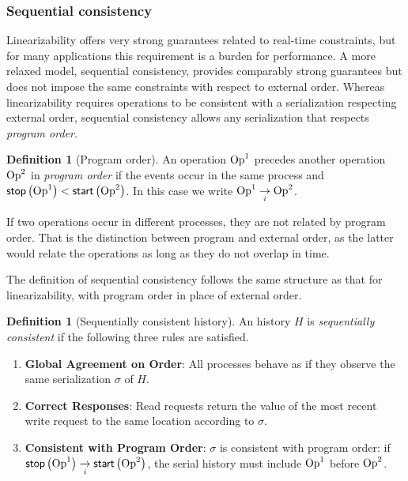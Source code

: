 \documentclass[]             %
{NASA}                       %
\theoremstyle{definition}
\newtheorem{definition}[theorem]{Definition}
\providecommand{\tightlist}{%
  \setlength{\itemsep}{0pt}\setlength{\parskip}{0pt}}
\begin{document}
\subsubsection{Sequential consistency}
\label{sequential-consistency}

Linearizability offers very strong guarantees related to real-time
constraints, but for many applications this requirement is a burden
for performance. A more relaxed model, sequential consistency,
provides comparably strong guarantees but does not impose the same
constraints with respect to external order. Whereas linearizability
requires operations to be consistent with a serialization respecting
external order, sequential consistency allows any serialization that
respects \emph{program order}.

\begin{definition}[Program order]
  An operation $\mathrm{Op}^1$ precedes another operation $\mathrm{Op}^2$ in
  \emph{program order} if the events occur in the same process and
  $\mathsf{stop}\left(\mathrm{Op}^1\right) < \mathsf{start}\left(\mathrm{Op}^2\right)$. In this case we write $\mathrm{Op}^1 \underset{i}{\to} \mathrm{Op}^2$.
\end{definition}
If two operations occur in different processes, they are not related
by program order. That is the distinction between program and external
order, as the latter would relate the operations as long as they do
not overlap in time.

The definition of sequential consistency follows the same structure as
that for linearizability, with program order in place of external
order.

\begin{definition}[Sequentially consistent history]
  \label{def:sequentially-consistent-history}
  An history $H$ is \emph{sequentially consistent} if the following
  three rules are satisfied.
\begin{enumerate}
  \tightlist
\item \textbf{Global Agreement on Order}: All processes behave as if
  they observe the same serialization $\sigma$ of $H$.
\item \textbf{Correct Responses}: Read requests return the value of
  the most recent write request to the same location according to $\sigma$.
\item \textbf{Consistent with Program Order}: $\sigma$ is consistent
  with program order: if
  $\mathsf{stop}\left(\mathrm{Op}^1\right) \underset{i}{\to} \mathsf{start}\left(\mathrm{Op}^2\right)$, the serial
  history must include $\mathrm{Op}^1$ before $\mathrm{Op}^2$.
\end{enumerate}
\end{definition}
\end{document}
